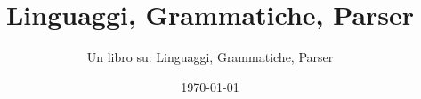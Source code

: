 \documentclass[
a4paper,
fontsize=10pt, %
twoside=false, %
numbers=auto, %
fontmethod = modern,
]{kaobook}
\begin{document}

\titlehead{Linguaggi, Grammatiche, Parser}
\subject{}

\title[Linguaggi, Grammatiche, Parser]{Linguaggi, Grammatiche, Parser}
\subtitle{Un libro su: Linguaggi, Grammatiche, Parser}

\date{\today}



\frontmatter %







\maketitle



\vfill
\end{document}
